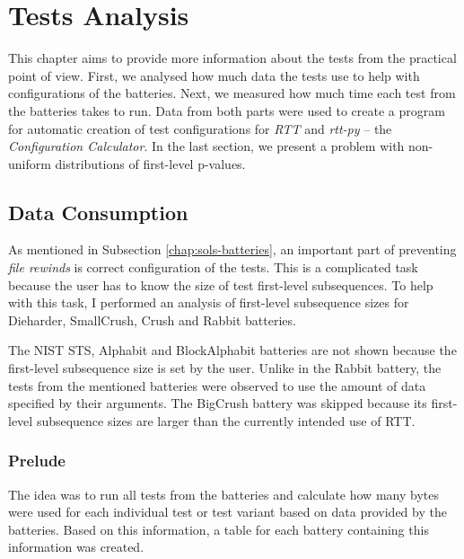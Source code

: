 \documentclass[
  digital,     %
  oneside,     %
  nosansbold,  %
  nocolorbold, %
  nolof,         %
  nolot,         %
]{fithesis4}
\begin{document}

\chapter{Tests Analysis} \label{chap: analysis}
This chapter aims to provide more information about the tests from the practical point of view. First, we analysed how much data the tests use to help with configurations of the batteries. Next, we measured how much time each test from the batteries takes to run. Data from both parts were used to create a program for automatic creation of test configurations for \emph{RTT} and \emph{rtt-py} -- the \emph{Configuration Calculator}. In the last section, we present a problem with non-uniform distributions of first-level p-values.




\section{Data Consumption} \label{chap:analysis-data}

As mentioned in Subsection \ref{chap:sols-batteries}, an important part of preventing \emph{file rewinds} is correct configuration of the tests. This is a complicated task because the user has to know the size of test first-level subsequences. To help with this task, I performed an analysis of first-level subsequence sizes for Dieharder, SmallCrush, Crush and Rabbit batteries.  

The NIST STS, Alphabit and BlockAlphabit batteries are not shown because the first-level subsequence size is set by the user. Unlike in the Rabbit battery, the tests from the mentioned batteries were observed to use the amount of data specified by their arguments. The BigCrush battery was skipped because its first-level subsequence sizes are larger than the currently intended use of RTT.


\subsection{Prelude} \label{chap:analysis-data-intro}
The idea was to run all tests from the batteries and calculate how many bytes were used for each individual test or test variant based on data provided by the batteries. Based on this information, a table for each battery containing this information was created.
\end{document}
